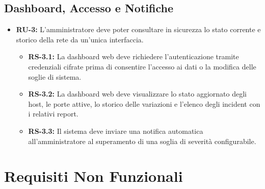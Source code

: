 \documentclass{article}
\begin{document}
\subsection{Dashboard, Accesso e Notifiche}
\begin{itemize}
    \item \textbf{RU-3:} L'amministratore deve poter consultare in sicurezza lo stato corrente e storico della rete da un'unica interfaccia.
    \begin{itemize}
        \item \textbf{RS-3.1:} La dashboard web deve richiedere l'autenticazione tramite credenziali cifrate prima di consentire l'accesso ai dati o la modifica delle soglie di sistema.
        \item \textbf{RS-3.2:} La dashboard web deve visualizzare lo stato aggiornato degli host, le porte attive, lo storico delle variazioni e l'elenco degli incident con i relativi report.
        \item \textbf{RS-3.3:} Il sistema deve inviare una notifica automatica all'amministratore al superamento di una soglia di severità configurabile.
    \end{itemize}
\end{itemize}

\section{Requisiti Non Funzionali}
\end{document}
